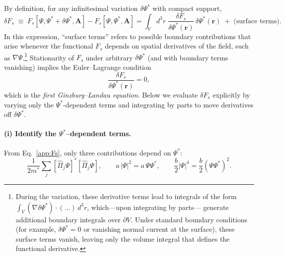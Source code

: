 By definition, for any infinitesimal variation $\delta\Psi^*$ with compact support,
\[
\delta F_s \;\equiv\; F_s[\Psi,\Psi^*+\delta\Psi^*,\mathbf A]-F_s[\Psi,\Psi^*,\mathbf A]
= \int_V d^3r\; \frac{\delta F_s}{\delta \Psi^*(\mathbf r)}\,\delta\Psi^*(\mathbf r)
\;+\; \text{(surface terms)}.
\]
In this expression, ``surface terms'' refers to possible boundary contributions 
that arise whenever the functional $F_s$ depends on spatial derivatives of the field, 
such as $\nabla\Psi$.\footnote{%
During the variation, these derivative terms lead to integrals of the form 
$\int_V (\nabla \delta\Psi^*) \cdot (\dots)\, d^3r$, which—upon integrating by parts—
generate additional boundary integrals over $\partial V$. 
Under standard boundary conditions (for example, $\delta\Psi^* = 0$ or vanishing normal current at the surface), 
these surface terms vanish, leaving only the volume integral that defines the functional derivative.%
}
Stationarity of $F_s$ under arbitrary $\delta\Psi^*$ (and with boundary terms vanishing)
implies the Euler--Lagrange condition
\begin{equation}
\frac{\delta F_s}{\delta \Psi^*(\mathbf r)} = 0,
\label{eq:EL_condition_Psi}
\end{equation}
which is the \emph{first Ginzburg--Landau equation}.
Below we evaluate $\delta F_s$ explicitly by varying only the $\Psi^*$-dependent terms
and integrating by parts to move derivatives off $\delta\Psi^*$.

\paragraph{(i) Identify the $\Psi^*$--dependent terms.}
From Eq.~\eqref{app:Fs}, only three contributions depend on $\Psi^*$:
\[
\frac{1}{2m^*} \sum_j [\hat\Pi_j\Psi]^* [\hat\Pi_j\Psi],\qquad
a\,|\Psi|^2 = a\,\Psi\Psi^*,\qquad
\frac{b}{2}|\Psi|^4 = \frac{b}{2}(\Psi\Psi^*)^2.
\]

